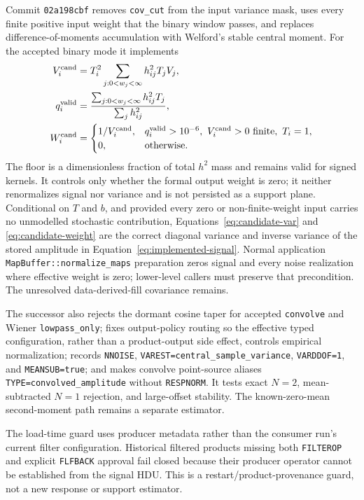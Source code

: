 \documentclass[11pt]{article}
\newcommand{\code}[1]{\nolinkurl{#1}}
\begin{document}
Commit \code{02a198cbf} removes \code{cov_cut} from the input variance mask,
uses every finite positive input weight that the binary window passes, and
replaces difference-of-moments accumulation with Welford's stable central
moment.  For the accepted binary mode it implements
\begin{align}
 V_i^{\rm cand}&=T_i^2\sum_{j:0<w_j<\infty}h_{ij}^2T_jV_j,
 \label{eq:candidate-var}\\
 q_i^{\rm valid}&={\sum_{j:0<w_j<\infty}h_{ij}^2T_j\over\sum_jh_{ij}^2},
 \label{eq:candidate-valid-support}\\
 W_i^{\rm cand}&=
 \begin{cases}
 1/V_i^{\rm cand},&q_i^{\rm valid}>10^{-6},\ V_i^{\rm cand}>0
                    \hbox{ finite},\ T_i=1,\\
 0,&\hbox{otherwise}.
 \end{cases}
 \label{eq:candidate-weight}
\end{align}
The floor is a dimensionless fraction of total $h^2$ mass and remains valid
for signed kernels.  It controls only whether the formal output weight is
zero; it neither renormalizes signal nor variance and is not persisted as a
support plane.  Conditional on $T$ and $b$, and provided every zero or
non-finite-weight input carries no unmodelled stochastic contribution,
Equations~\eqref{eq:candidate-var} and \eqref{eq:candidate-weight} are the
correct diagonal variance and inverse variance of the stored amplitude in
Equation~\eqref{eq:implemented-signal}.  Normal application
\code{MapBuffer::normalize_maps} preparation zeros signal and every noise
realization where effective weight is zero; lower-level callers must preserve
that precondition.  The unresolved data-derived-fill covariance remains.

The successor also rejects the dormant cosine taper for accepted
\code{convolve} and Wiener \code{lowpass_only}; fixes output-policy routing so
the effective typed configuration, rather than a product-output side effect,
controls empirical normalization; records \code{NNOISE},
\code{VAREST=central_sample_variance}, \code{VARDDOF=1}, and
\code{MEANSUB=true}; and makes convolve point-source aliases
\code{TYPE=convolved_amplitude} without \code{RESPNORM}.  It tests exact
$N=2$, mean-subtracted $N=1$ rejection, and large-offset stability.  The
known-zero-mean second-moment path remains a separate estimator.

The load-time guard uses producer metadata rather than the consumer run's
current filter configuration.  Historical filtered products missing both
\code{FILTEROP} and explicit \code{FLFBACK} approval fail closed because their
producer operator cannot be established from the signal HDU.  This is a
restart/product-provenance guard, not a new response or support estimator.
\end{document}
